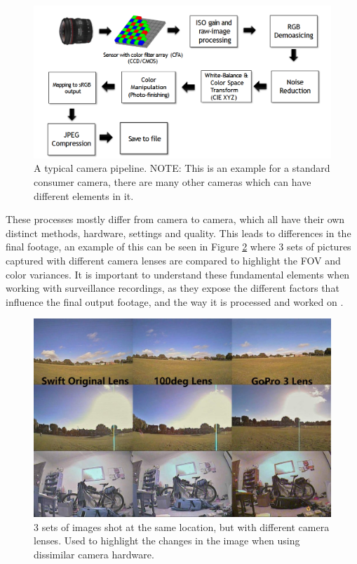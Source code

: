 \begin{figure}[H]
    \centering
    \includegraphics[width=1\linewidth]{figures/images/How_camera_works_pipeline.png}
    \caption{A typical camera pipeline.
    NOTE: This is an example for a standard consumer camera, there are many other cameras which can have different elements in it. }
    \label{fig:camera_pipeline}
\end{figure}
\noindent
These processes mostly differ from camera to camera, which all have their own distinct methods, hardware, settings and quality. This leads to differences in the final footage, an example of this can be seen in Figure \ref{fig:lens_comparison} where 3 sets of pictures captured with different camera lenses are compared to highlight the \ac{FOV} and color variances. It is important to understand these fundamental elements when working with surveillance recordings, as they expose the different factors that influence the final output footage, and the way it is processed and worked on \cite{korene_imatest2022_cv_iq}.
\begin{figure}[H]
    \centering
    \includegraphics[width=0.7\linewidth]{figures/images/runcam-swift-lens-comparison.jpg}
    \caption{3 sets of images shot at the same location, but with different camera lenses. Used to highlight the changes in the image when using dissimilar camera hardware.}
    \label{fig:lens_comparison}
\end{figure}
